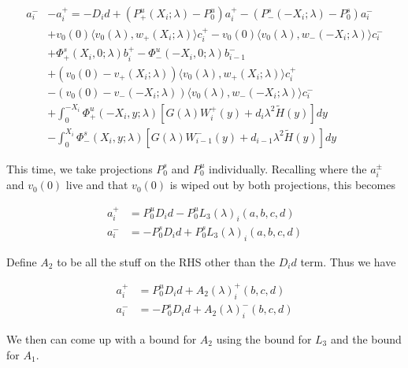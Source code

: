 \documentclass[12pt]{article}
\begin{document}
\begin{enumerate}
\begin{align*}
a_i^- &- a_i^+ = -D_i d + (P^u_+(X_i; \lambda) - P_0^u)a_i^+ - (P^s_-(-X_i; \lambda) - P_0^s)a_i^- \\
&+ v_0(0) \langle v_0(\lambda), w_+(X_i; \lambda) \rangle c_i^+ 
- v_0(0) \langle v_0(\lambda), w_-(-X_i; \lambda) \rangle c_i^- \\
&+ \Phi^s_+(X_i, 0; \lambda)b_i^+ - \Phi^u_-(-X_i, 0; \lambda)b_{i-1}^- \\
&+ (v_0(0) - v_+(X_i; \lambda)) \langle v_0(\lambda), w_+(X_i; \lambda) \rangle c_i^+ \\
&- (v_0(0) - v_-(-X_i; \lambda)) \langle v_0(\lambda), w_-(-X_i; \lambda) \rangle c_i^- \\
&+ \int_0^{-X_i} \Phi^u_+(-X_i, y; \lambda) [ G(\lambda)W_i^+(y) + d_i \lambda^2 \tilde{H}(y) ] dy \\
&- \int_0^{X_i} \Phi^s_-(X_i, y; \lambda) [ G(\lambda)W_{i-1}^-(y) + d_{i-1} \lambda^2 \tilde{H}(y) ] dy  
\end{align*}

This time, we take projections $P^s_0$ and $P^u_0$ individually. Recalling where the $a_i^\pm$ and $v_0(0)$ live and that $v_0(0)$ is wiped out by both projections, this becomes 

\begin{align*}
a_i^+ &= P^u_0 D_i d - P^u_0 L_3(\lambda)_i(a, b, c, d) \\
a_i^- &= -P^s_0 D_i d + P^s_0 L_3(\lambda)_i(a, b, c, d)
\end{align*}

Define $A_2$ to be all the stuff on the RHS other than the $D_i d$ term. Thus we have 

\begin{align*}
a_i^+ &= P^u_0 D_i d + A_2(\lambda)_i^+(b, c, d) \\
a_i^- &= -P^s_0 D_i d + A_2(\lambda)_i^-(b, c, d)
\end{align*}

We then can come up with a bound for $A_2$ using the bound for $L_3$ and the bound for $A_1$.


\end{enumerate}
\end{document}

